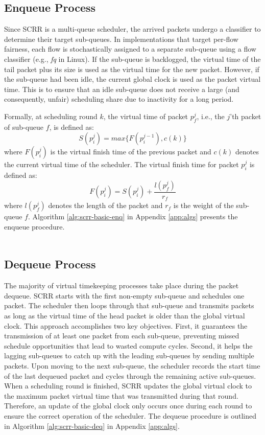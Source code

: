 \subsection{Enqueue Process}
Since SCRR is a multi-queue scheduler, the arrived packets undergo a classifier to determine their target sub-queues. In implementations that target per-flow fairness, each flow is stochastically assigned to a separate sub-queue using a flow classifier (e.g., \textit{fq} in Linux). 
If the sub-queue is backlogged, the virtual time of the tail packet plus its size is used as the virtual time for the new packet. However, if the sub-queue had been idle, the current global clock is used as the packet virtual time. This is to ensure that an idle sub-queue does not receive a large (and consequently, unfair) scheduling share due to inactivity for a long period. 


Formally, at scheduling round $k$, the virtual time of packet $p_{f}^{j}$, i.e., the $j$'th packet of sub-queue $f$, is defined as:
\begin{equation}
\label{equa:virtual-enqueue}
    S(p_{i}^{j}) = max\{F(p_{i}^{j-1}), c(k)\}
\end{equation}
where $F(p_{i}^{j})$ is the virtual finish time of the previous packet and $c(k)$ denotes the current virtual time of the scheduler.
The virtual finish time for packet $p_{i}^{j}$ is defined as:
\begin{equation}
\label{equa:virtual-previous}
    F(p_{i}^{j}) = S(p_{i}^{j}) + \frac{l(p_f^j)}{r_f}
\end{equation}
where $l(p_f^j)$ denotes the length of the packet and $r_f$ is the weight of the sub-queue $f$.
Algorithm \ref{alg:scrr-basic-enq} in Appendix \ref{app:algs} presents the enqueue procedure.
\\
\\
\subsection{Dequeue Process}
\label{sec:dequeue}
The majority of virtual timekeeping processes take place during the packet dequeue. 
SCRR starts with the first non-empty sub-queue and schedules one packet. The scheduler then loops through that sub-queue and transmits packets as long as the virtual time of the head packet is older than the global virtual clock. This approach accomplishes two key objectives. First, it guarantees the transmission of at least one packet from each sub-queue, preventing missed schedule opportunities that lead to wasted compute cycles. Second, it helps the lagging sub-queues to catch up with the leading sub-queues by sending multiple packets. Upon moving to the next sub-queue, the scheduler records the start time of the last dequeued packet and cycles through the remaining active sub-queues. When a scheduling round is finished, SCRR updates the global virtual clock to the maximum packet virtual time that was transmitted during that round. Therefore, an update of the global clock only occurs once during each round to ensure the correct operation of the scheduler. The dequeue procedure is outlined in Algorithm \ref{alg:scrr-basic-deq} in Appendix \ref{app:algs}.

